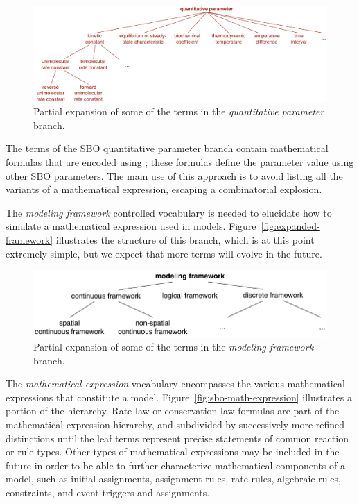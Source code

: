 \begin{figure}[tbh]
  \centering
  \vspace{-2ex}
  \includegraphics[scale = 0.86]{figs/sbo-quantitative-parameter}
  \caption{Partial expansion of some of the terms in the
    \emph{quantitative parameter} branch.}
  \label{fig:expanded-parameter}
\end{figure}

The terms of the SBO quantitative parameter branch contain
mathematical formulas that are encoded using \mathmltwo; these
formulas define the parameter value using other SBO parameters.
The main use of this approach is to avoid listing all the variants
of a mathematical expression, escaping a combinatorial explosion.

The \emph{modeling framework} controlled vocabulary is needed to
elucidate how to simulate a mathematical expression used in models.
Figure~\vref{fig:expanded-framework} illustrates the structure of
this branch, which is at this point extremely simple, but we
expect that more terms will evolve in the future.

\begin{figure}[tbh]
  \centering
  \vspace{-1ex}
  \includegraphics[scale = 0.83]{figs/sbo-framework}
  \caption{Partial expansion of some of the terms in the
    \emph{modeling framework} branch.}
  \label{fig:expanded-framework}
\end{figure}

The \emph{mathematical expression} vocabulary encompasses the
various mathematical expressions that constitute a model.
Figure~\vref{fig:sbo-math-expression} illustrates a portion of the
hierarchy.  Rate law or conservation law formulas are part of the
mathematical expression hierarchy, and subdivided by successively
more refined distinctions until the leaf terms represent precise
statements of common reaction or rule types.  Other types of
mathematical expressions may be included in the future in order to
be able to further characterize mathematical components of a
model, such as initial assignments, assignment rules, rate rules,
algebraic rules, constraints, and event triggers and assignments.

